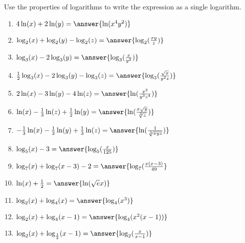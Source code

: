 \documentclass{ximera}
\author{Carl Stitz \and Jeff Zeager \and Bart Snapp \and Matthew Carr}
\begin{document}
\begin{exercise}






Use the properties of logarithms to write the expression as a single
logarithm. 

\begin{multicols}{2}
\begin{enumerate}
\item $4\ln(x) + 2\ln(y)\\=\answer{\ln(x^4y^2)}$ \label{combinelogfirst}
\item $\log_{2}(x) + \log_{2}(y) - \log_{2}(z)\\=\answer{\log_{2}(\frac{xy}{z})}$
\item $\log_{3}(x) - 2 \log_{3}(y)\\=\answer{\log_{3}(\frac{x}{y^2})}$
\item $\frac{1}{2}\log_{3}(x) - 2\log_{3}(y) - \log_{3}(z)\\=\answer{\log_{3}(\frac{\sqrt{x}}{y^2 z})}$
\item $2 \ln(x) -3 \ln(y) - 4\ln(z)\\=\answer{\ln(\frac{x^2}{y^3z^4})}$
\item $\ln(x) - \frac{1}{3} \ln(z) + \frac{1}{2} \ln(y)\\=\answer{\ln(\frac{x\sqrt{y}}{\sqrt[3]{z}})}$
\item $-\frac{1}{3} \ln(x) - \frac{1}{3}\ln(y) + \frac{1}{3} \ln(z)\\=\answer{\ln(\frac{1}{\sqrt[3]{xyz}})}$
\item $\log_{5}(x) - 3\\=\answer{\log_{5}(\frac{x}{125})}$
\item $\log_{7}(x) + \log_{7}(x - 3) - 2\\=\answer{\log_{7}(\frac{x(x-3)}{49}}$
\item $\ln(x) + \frac{1}{2}\\=\answer{\ln(\sqrt{e}x)}$ 
\item $\log_{2}(x) + \log_{4}(x)\\=\answer{\log_{4}(x^{3})}$ 
\item $\log_{2}(x) + \log_{4}(x-1)\\=\answer{\log_{4}(x^2(x-1))}$
\item $\log_{2}(x) + \log_{\frac{1}{2}}(x - 1)\\=\answer{\log_{2}(\frac{x}{x-1})}$ \label{combineloglast}
\end{enumerate}
\end{multicols}

\end{exercise}
\end{document}
